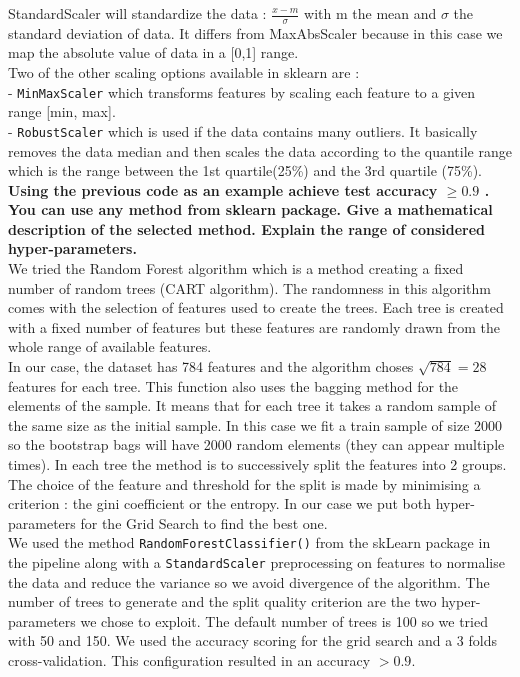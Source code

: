 StandardScaler will standardize the data : $\frac{x-m}{\sigma}$ with m the mean and $\sigma$ the standard deviation of data. It differs from MaxAbsScaler  because in this case we map the absolute value of data in a [0,1] range.\\	

Two of the other scaling options available in sklearn are : \\
- \verb|MinMaxScaler| which transforms features by scaling each feature to a given range [min, max]. \\
- \verb|RobustScaler| which is used if the data contains many outliers. It basically removes the data median and then scales the data according to the quantile range which is the range between the 1st quartile(25\%) and the 3rd quartile (75\%). \\ 

\textbf{Using the previous code as an example achieve test accuracy  $\geq0.9$ . You can use any method from sklearn package. Give a mathematical description of the selected method. Explain the range of considered hyper-parameters.}\\

We tried the Random Forest algorithm which is a method creating a fixed number of random trees (CART algorithm). The randomness in this algorithm comes with the selection of features used to create the trees. Each tree is created with a fixed number of features but these features are randomly drawn from the whole range of available features. \\

In our case, the dataset has 784 features and the algorithm choses $\sqrt{784} = 28$ features for each tree. This function also uses the bagging method for the elements of the sample. It means that for each tree it takes a random sample of the same size as the initial sample. In this case we fit a train sample of size 2000 so the bootstrap bags will have 2000 random elements (they can appear multiple times). In each tree the method is to successively split the features into 2 groups. The choice of the feature and threshold for the split is made by minimising a criterion : the gini coefficient or the entropy. In our case we put both hyper-parameters for the Grid Search to find the best one. \\

We used the method \verb|RandomForestClassifier()| from the skLearn package in the pipeline along with a \verb|StandardScaler| preprocessing on features to normalise the data and reduce the variance so we avoid divergence of the algorithm. The number of trees to generate and the split quality criterion are the two hyper-parameters we chose to exploit. The default number of trees is 100 so we tried with 50 and 150. We used the accuracy scoring for the grid search and a 3 folds cross-validation. This configuration resulted in an accuracy $>0.9$.

